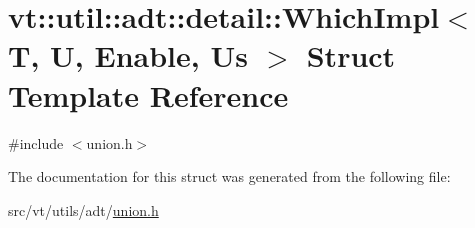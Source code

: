 \hypertarget{structvt_1_1util_1_1adt_1_1detail_1_1_which_impl}{}\section{vt\+:\+:util\+:\+:adt\+:\+:detail\+:\+:Which\+Impl$<$ T, U, Enable, Us $>$ Struct Template Reference}
\label{structvt_1_1util_1_1adt_1_1detail_1_1_which_impl}


{\ttfamily \#include $<$union.\+h$>$}



The documentation for this struct was generated from the following file\+:\begin{DoxyCompactItemize}
\item 
src/vt/utils/adt/\hyperlink{union_8h}{union.\+h}\end{DoxyCompactItemize}
